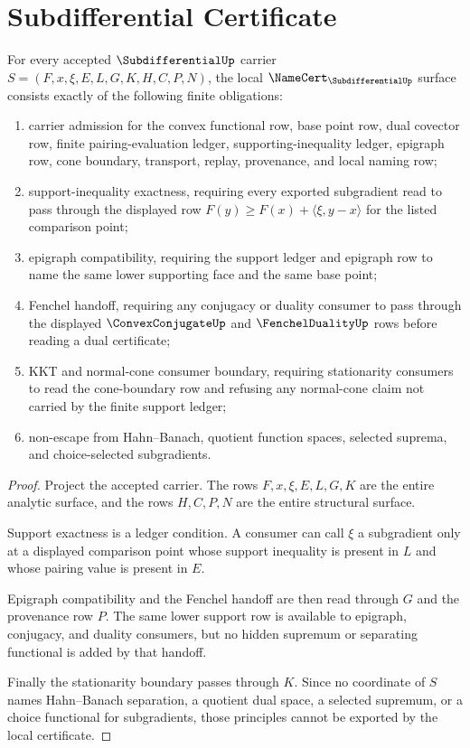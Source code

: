 \section{Subdifferential Certificate}
\label{sec:subdifferential-certificate}

\begin{theorem}
\label{thm:subdifferential-namecert-obligations}
For every accepted $\SubdifferentialUp$ carrier $S=(F,x,\xi,E,L,G,K,H,C,P,N)$, the local $\NameCert_{\SubdifferentialUp}$ surface consists exactly of the following finite obligations:
\begin{enumerate}
\item carrier admission for the convex functional row, base point row, dual covector row, finite pairing-evaluation ledger, supporting-inequality ledger, epigraph row, cone boundary, transport, replay, provenance, and local naming row;
\item support-inequality exactness, requiring every exported subgradient read to pass through the displayed row $F(y)\geq F(x)+\langle \xi,y-x\rangle$ for the listed comparison point;
\item epigraph compatibility, requiring the support ledger and epigraph row to name the same lower supporting face and the same base point;
\item Fenchel handoff, requiring any conjugacy or duality consumer to pass through the displayed $\ConvexConjugateUp$ and $\FenchelDualityUp$ rows before reading a dual certificate;
\item KKT and normal-cone consumer boundary, requiring stationarity consumers to read the cone-boundary row and refusing any normal-cone claim not carried by the finite support ledger;
\item non-escape from Hahn--Banach, quotient function spaces, selected suprema, and choice-selected subgradients.
\end{enumerate}
\end{theorem}
\begin{proof}
Project the accepted carrier. The rows $F,x,\xi,E,L,G,K$ are the entire analytic surface, and the rows $H,C,P,N$ are the entire structural surface.

Support exactness is a ledger condition. A consumer can call $\xi$ a subgradient only at a displayed comparison point whose support inequality is present in $L$ and whose pairing value is present in $E$.

Epigraph compatibility and the Fenchel handoff are then read through $G$ and the provenance row $P$. The same lower support row is available to epigraph, conjugacy, and duality consumers, but no hidden supremum or separating functional is added by that handoff.

Finally the stationarity boundary passes through $K$. Since no coordinate of $S$ names Hahn--Banach separation, a quotient dual space, a selected supremum, or a choice functional for subgradients, those principles cannot be exported by the local certificate.
\end{proof}

